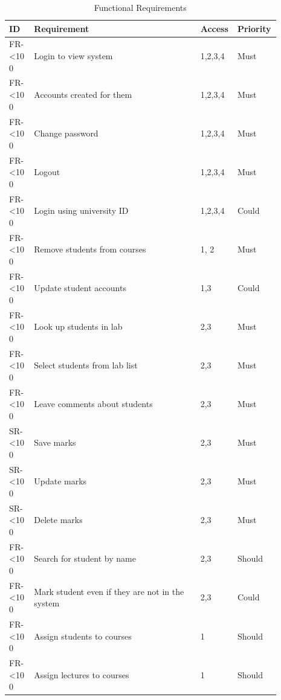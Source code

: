 \documentclass[12pt]{article}  %
\newcommand{\rid}[1]{\centering #1-\ifnum\value{requirement}<10 0\fi\arabic{requirement}
\stepcounter{requirement}}
\begin{document}
\begin{spacing}{1.1}
\begin{longtable}{|p{0.09\linewidth}|p{0.6\linewidth}|p{0.1\linewidth}|
p{0.1\linewidth}|}
\caption{Functional Requirements} \label{table:eval-funct-user} \\ \hline
\textbf{ID} & \textbf{Requirement} & \textbf{Access} & \textbf{Priority}\\
\hline \hline

\rowcolor{Green} \rid{FR} &  Login to view system & 1,2,3,4 & Must\\ \hline
\rowcolor{Green} \rid{FR} &  Accounts created for them & 1,2,3,4 & Must\\ \hline
\rowcolor{Red} \rid{FR} &  Change password & 1,2,3,4 & Must\\ \hline
\rowcolor{Green} \rid{FR} &  Logout & 1,2,3,4 & Must \\ \hline
\rowcolor{Yellow} \rid{FR} &  Login using university ID & 1,2,3,4 & Could\\ \hline

\rowcolor{Green} \rid{FR} &  Remove students from courses & 1, 2 & Must\\ \hline
\rowcolor{Yellow} \rid{FR} &  Update student accounts & 1,3 & Could \\ \hline

\rowcolor{Green} \rid{FR} &  Look up students in lab & 2,3 & Must\\ \hline
\rowcolor{Green} \rid{FR} &  Select students from lab list & 2,3 & Must\\ \hline
\rowcolor{Green} \rid{FR} &  Leave comments about students & 2,3 & Must\\ \hline
\rowcolor{Green} \rid{SR} &  Save marks & 2,3 & Must\\ \hline
\rowcolor{Green} \rid{SR} &  Update marks & 2,3 & Must\\ \hline
\rowcolor{Red} \rid{SR} &  Delete marks & 2,3 & Must\\ \hline
\rowcolor{Green} \rid{FR} &  Search for student by name & 2,3 & Should\\ \hline
\rowcolor{Yellow} \rid{FR} &  Mark student even if they are not in the system & 2,3 & Could \\ \hline

\rowcolor{Green} \rid{FR} &  Assign students to courses & 1 & Should\\ \hline
\rowcolor{Green} \rid{FR} &  Assign lectures to courses & 1 & Should\\ \hline


\end{longtable}
\end{spacing}
\end{document}
